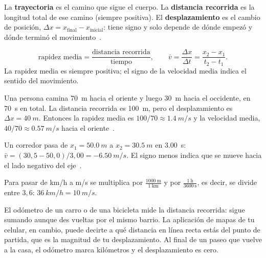 \documentclass[11pt]{article}
\begin{document}
La \textbf{trayectoria} es el camino que sigue el cuerpo. La \textbf{distancia recorrida} es la
longitud total de ese camino (siempre positiva). El \textbf{desplazamiento} es el cambio de
posición, $\Delta x = x_{\text{final}} - x_{\text{inicial}}$: tiene signo y solo depende de dónde
empezó y dónde terminó el movimiento~\cite{recurso10}.

\begin{definicion}
\[
  \text{rapidez media} = \frac{\text{distancia recorrida}}{\text{tiempo}},
  \qquad
  \bar v = \frac{\Delta x}{\Delta t} = \frac{x_2 - x_1}{t_2 - t_1}.
\]
La rapidez media es siempre positiva; el signo de la velocidad media indica el sentido del
movimiento.
\end{definicion}

\begin{ejemplo}
Una persona camina \qty{70}{m} hacia el oriente y luego \qty{30}{m} hacia el occidente, en
\qty{70}{s} en total. La distancia recorrida es \qty{100}{m}, pero el desplazamiento es
$\Delta x = \qty{+40}{m}$. Entonces la rapidez media es
$100/70 \approx \qty{1,4}{m/s}$ y la velocidad media, $40/70 \approx \qty{0,57}{m/s}$ hacia el
oriente~\cite{recurso10}.
\end{ejemplo}

\begin{ejemplo}
Un corredor pasa de $x_1 = \qty{50,0}{m}$ a $x_2 = \qty{30,5}{m}$ en \qty{3,00}{s}:
$\bar v = (30{,}5 - 50{,}0)/3{,}00 = \qty{-6,50}{m/s}$. El signo menos indica que se mueve
hacia el lado negativo del eje~\cite{recurso10}.
\end{ejemplo}

Para pasar de km/h a m/s se multiplica por $\frac{1000\ \text{m}}{1\ \text{km}}$ y por
$\frac{1\ \text{h}}{3600\ \text{s}}$, es decir, se divide entre $3{,}6$:
$\qty{36}{km/h} = \qty{10}{m/s}$.

\begin{aplicacion}
El odómetro de un carro o de una bicicleta mide la distancia recorrida: sigue sumando aunque
des vueltas por el mismo barrio. La aplicación de mapas de tu celular, en cambio, puede
decirte a qué distancia en línea recta estás del punto de partida, que es la magnitud de tu
desplazamiento. Al final de un paseo que vuelve a la casa, el odómetro marca kilómetros y el
desplazamiento es cero.
\end{aplicacion}
\end{document}
